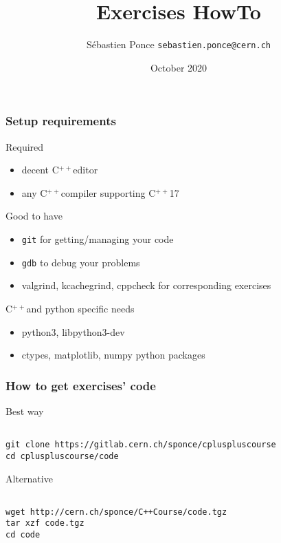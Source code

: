 \documentclass[compress]{beamer}
\title{Exercises HowTo}
\author[S. Ponce]{S\'ebastien Ponce  \texttt{sebastien.ponce@cern.ch}}
\institute{CERN}
\date{October 2020}
\newcommand{\cpp}{C$^{++}$}
\begin{document}
\begin{frame}
  \titlepage
\end{frame}

\begin{frame}
  \frametitle{Setup requirements}
  \begin{exampleblock}{Required}
    \begin{itemize}
    \item decent \cpp editor
    \item any \cpp compiler supporting \cpp17
    \end{itemize}
  \end{exampleblock}
  \begin{alertblock}{Good to have}
    \begin{itemize}
    \item \texttt{git} for getting/managing your code
    \item \texttt{gdb} to debug your problems
    \item valgrind, kcachegrind, cppcheck for corresponding exercises
    \end{itemize}
  \end{alertblock}
  \begin{block}{\cpp and python specific needs}
    \begin{itemize}
    \item python3, libpython3-dev
    \item ctypes, matplotlib, numpy python packages
    \end{itemize}
  \end{block}
\end{frame}

\begin{frame}[fragile]
  \frametitle{How to get exercises' code}
  \begin{exampleblock}{Best way}
    \begin{verbatim}
  
git clone https://gitlab.cern.ch/sponce/cpluspluscourse
cd cpluspluscourse/code
    \end{verbatim}
  \end{exampleblock}
  \begin{alertblock}{Alternative}
    \begin{verbatim}
  
wget http://cern.ch/sponce/C++Course/code.tgz
tar xzf code.tgz
cd code
    \end{verbatim}    
  \end{alertblock}
\end{frame}
\end{document}
